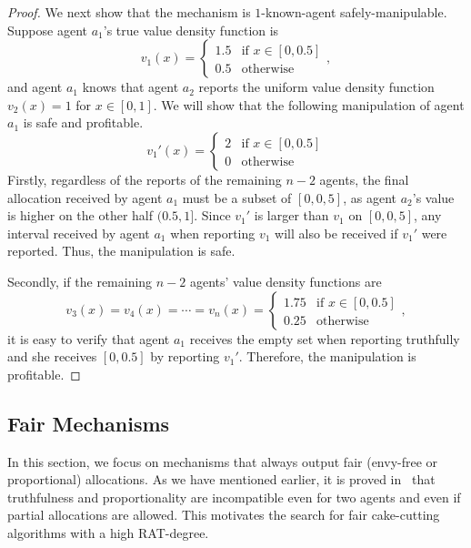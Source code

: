 \begin{proof}
    We next show that the mechanism is $1$-known-agent safely-manipulable.
    Suppose agent $a_1$'s true value density function is
    $$v_1(x)=\left\{\begin{array}{ll}
        1.5 & \mbox{if }x\in[0,0.5] \\
        0.5 & \mbox{otherwise}
    \end{array}\right.,$$ 
    and agent $a_1$ knows that agent $a_2$ reports the uniform value density function $v_2(x)=1$ for $x\in[0,1]$.
    We will show that the following manipulation of agent $a_1$ is safe and profitable.
    $$v_1'(x)=\left\{\begin{array}{ll}
        2 & \mbox{if }x\in[0,0.5] \\
        0 & \mbox{otherwise}
    \end{array}\right.$$
    Firstly, regardless of the reports of the remaining $n-2$ agents, the final allocation received by agent $a_1$ must be a subset of $[0,0,5]$, as agent $a_2$'s value is higher on the other half $(0.5,1]$.
    Since $v_1'$ is larger than $v_1$ on $[0,0,5]$, any interval received by agent $a_1$ when reporting $v_1$ will also be received if $v_1'$ were reported.
    Thus, the manipulation is safe.

    Secondly, if the remaining $n-2$ agents' value density functions are
    $$v_3(x)=v_4(x)=\cdots=v_n(x)=\left\{\begin{array}{ll}
        1.75 & \mbox{if }x\in[0,0.5] \\
        0.25 & \mbox{otherwise}
    \end{array}\right.,$$
    it is easy to verify that agent $a_1$ receives the empty set when reporting truthfully and she receives $[0,0.5]$ by reporting $v_1'$.
    Therefore, the manipulation is profitable.
\end{proof}

\subsection{Fair Mechanisms}
\label{sect:cake-fair}
In this section, we focus on mechanisms that always output fair (envy-free or proportional) allocations.
As we have mentioned earlier, it is proved in~\citet{tao2022existence} that truthfulness and proportionality are incompatible even for two agents and even if partial allocations are allowed.
This motivates the search for fair cake-cutting algorithms with a high RAT-degree.

